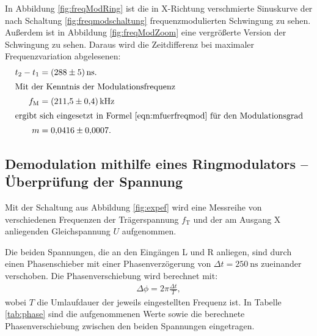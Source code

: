 In Abbildung \ref{fig:freqModRing} ist die in X-Richtung verschmierte Sinuskurve der nach Schaltung \ref{fig:freqmodschaltung} frequenzmodulierten Schwingung zu sehen. Außerdem ist in Abbildung \ref{fig:freqModZoom} eine vergrößerte Version der Schwingung zu sehen. Daraus wird die Zeitdifferenz bei maximaler Frequenzvariation abgelesenen:
\begin{align*}
  t_2 - t_1 &= \SI{288(5)}{\nano\second}.\\
\intertext{Mit der Kenntnis der Modulationsfrequenz}
  f_\text{M} &= \SI{211.5(4)}{\kilo\hertz}\\
\intertext{ergibt sich eingesetzt in Formel \eqref{eqn:mfuerfreqmod} für den Modulationsgrad}
  m &= \num{0.0416(7)}.
\end{align*}


\subsection{Demodulation mithilfe eines Ringmodulators -- Überprüfung der Spannung}

Mit der Schaltung aus Abbildung \ref{fig:expef} wird eine Messreihe von verschiedenen Frequenzen der Trägerspannung $f_\text{T}$ und der am Ausgang X anliegenden Gleichspannung $U$ aufgenommen.

Die beiden Spannungen, die an den Eingängen L und R anliegen, sind durch einen Phasenschieber mit einer Phasenverzögerung von $\Delta t = \SI{250}{\nano\second}$ zueinander verschoben.
Die Phasenverschiebung wird berechnet mit:
\begin{align}
  \Delta \phi = 2 \pi \frac{\Delta t}{T},
\end{align}
wobei $T$ die Umlaufdauer der jeweils eingestellten Frequenz ist.
In Tabelle \ref{tab:phase} sind die aufgenommenen Werte sowie die berechnete Phasenverschiebung zwischen den beiden Spannungen eingetragen.

